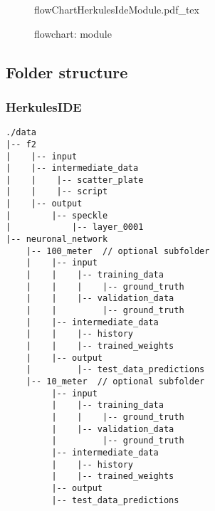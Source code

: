 \documentclass[
10pt, %
a4paper, %
onecolumn
portrait
]{article}
\begin{document}
\begin{figure}[htb]
	\centering
	{flowChartHerkulesIdeModule.pdf_tex}
	\caption{flowchart: module}
	\label{fig:flowChartHerkulesIdeModule}
\end{figure}

\FloatBarrier
\subsection{Folder structure}

\subsubsection{HerkulesIDE}

\begin{lstlisting}[caption={Herkules data example folder structure}]
./data
|-- f2
|    |-- input
|    |-- intermediate_data
|    |    |-- scatter_plate
|    |    |-- script
|    |-- output
|        |-- speckle
|            |-- layer_0001
|-- neuronal_network
	|-- 100_meter  // optional subfolder
	|    |-- input
	|    |    |-- training_data
	|    |    |    |-- ground_truth
	|    |    |-- validation_data
	|    |         |-- ground_truth
	|    |-- intermediate_data
	|    |    |-- history
	|    |    |-- trained_weights
	|    |-- output
	|         |-- test_data_predictions
	|-- 10_meter  // optional subfolder
         |-- input
         |    |-- training_data
         |    |    |-- ground_truth
         |    |-- validation_data
         |         |-- ground_truth
         |-- intermediate_data
         |    |-- history
         |    |-- trained_weights
         |-- output
         |-- test_data_predictions

\end{lstlisting}

\newpage
\end{document}
